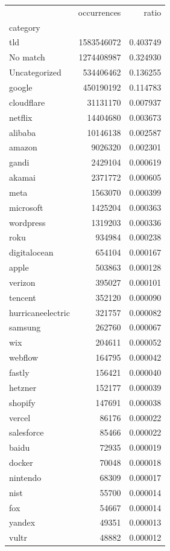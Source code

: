\begin{tabular}{lrr}
\toprule
 & occurrences & ratio \\
category &  &  \\
\midrule
tld & 1583546072 & 0.403749 \\
No match & 1274408987 & 0.324930 \\
Uncategorized & 534406462 & 0.136255 \\
google & 450190192 & 0.114783 \\
cloudflare & 31131170 & 0.007937 \\
netflix & 14404680 & 0.003673 \\
alibaba & 10146138 & 0.002587 \\
amazon & 9026320 & 0.002301 \\
gandi & 2429104 & 0.000619 \\
akamai & 2371772 & 0.000605 \\
meta & 1563070 & 0.000399 \\
microsoft & 1425204 & 0.000363 \\
wordpress & 1319203 & 0.000336 \\
roku & 934984 & 0.000238 \\
digitalocean & 654104 & 0.000167 \\
apple & 503863 & 0.000128 \\
verizon & 395027 & 0.000101 \\
tencent & 352120 & 0.000090 \\
hurricaneelectric & 321757 & 0.000082 \\
samsung & 262760 & 0.000067 \\
wix & 204611 & 0.000052 \\
webflow & 164795 & 0.000042 \\
fastly & 156421 & 0.000040 \\
hetzner & 152177 & 0.000039 \\
shopify & 147691 & 0.000038 \\
vercel & 86176 & 0.000022 \\
salesforce & 85466 & 0.000022 \\
baidu & 72935 & 0.000019 \\
docker & 70048 & 0.000018 \\
nintendo & 68309 & 0.000017 \\
nist & 55700 & 0.000014 \\
fox & 54667 & 0.000014 \\
yandex & 49351 & 0.000013 \\
vultr & 48882 & 0.000012 \\

\end{tabular}
